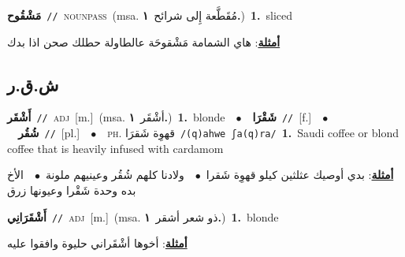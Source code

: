 \documentclass[10pt,a4paper,twoside]{article} %
\begin{document}
\begin{multicols}{2}
{\setlength\topsep{0pt}\textbf{\foreignlanguage{arabic}{مَشْقُوح}}\ {\color{gray}\texttt{//}\color{black}}\ \textsc{noun\textunderscore pass}\ \color{gray}(msa. \foreignlanguage{arabic}{مُقَطَّعة إِلى شرائح}~\foreignlanguage{arabic}{\textbf{١.}})\color{black}\ \textbf{1.}~sliced\  \begin{flushright}\color{gray}\foreignlanguage{arabic}{\textbf{\underline{\foreignlanguage{arabic}{أمثلة}}}: هاي الشمامة مَشْقوحَة عالطاولة حطلك صحن اذا بدك}\end{flushright}\color{black}} \vspace{2mm}

\vspace{-3mm}
\subsection*{\color{blue}\foreignlanguage{arabic}{ش.ق.ر}\color{blue}{}} 

{\setlength\topsep{0pt}\textbf{\foreignlanguage{arabic}{أَشْقَر}}\ {\color{gray}\texttt{//}\color{black}}\ \textsc{adj}\ [m.]\ \color{gray}(msa. \foreignlanguage{arabic}{أشْقَر}~\foreignlanguage{arabic}{\textbf{١.}})\color{black}\ \textbf{1.}~blonde\ \ $\bullet$\ \ \setlength\topsep{0pt}\textbf{\foreignlanguage{arabic}{شَقْرَا}}\ {\color{gray}\texttt{//}\color{black}}\ [f.]\ \ $\bullet$\ \ \setlength\topsep{0pt}\textbf{\foreignlanguage{arabic}{شُقُر}}\ {\color{gray}\texttt{//}\color{black}}\ [pl.]\ \ $\bullet$\ \ \textsc{ph.} \color{gray} \foreignlanguage{arabic}{قهوِة شَقرَا}\color{black}\ {\color{gray}\texttt{/{\sffamily (q)ahwe ʃa(q)ra}/}\color{black}}\ \textbf{1.}~Saudi coffee or blond coffee that is heavily infused with cardamom\  \begin{flushright}\color{gray}\foreignlanguage{arabic}{\textbf{\underline{\foreignlanguage{arabic}{أمثلة}}}: بدي أوصيك عثلثين كيلو قهوِة شَقرا\ $\bullet$\ \  ولادنا كلهم شُقُر وعينيهم ملونة\ $\bullet$\ \  الأخ بده وحدة شَقْرا وعيونها زرق}\end{flushright}\color{black}} \vspace{2mm}

{\setlength\topsep{0pt}\textbf{\foreignlanguage{arabic}{أَشْقَرَانِي}}\ {\color{gray}\texttt{//}\color{black}}\ \textsc{adj}\ [m.]\ \color{gray}(msa. \foreignlanguage{arabic}{ذو شعر أشقر}~\foreignlanguage{arabic}{\textbf{١.}})\color{black}\ \textbf{1.}~blonde\  \begin{flushright}\color{gray}\foreignlanguage{arabic}{\textbf{\underline{\foreignlanguage{arabic}{أمثلة}}}: أخوها أشْقَراني حليوة وافقوا عليه}\end{flushright}\color{black}} \vspace{2mm}


\end{multicols}
\end{document}
